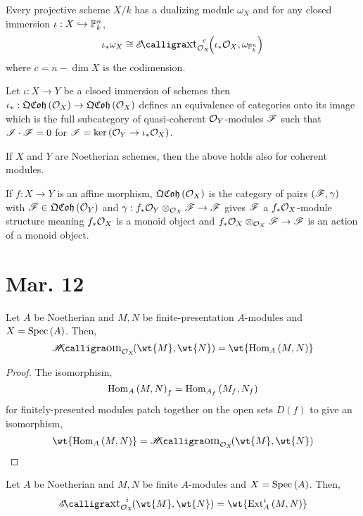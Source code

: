 \documentclass[12pt]{article}
\begin{document}
\begin{theorem}
Every projective scheme $X / k$ has a dualizing module $\omega_X$ and for any closed immersion $\iota : X \hookrightarrow \mathbb{P}^n_k$,
\[ \iota_* \omega_X \cong \shExt{c}{\struct{X}}{\iota_* \struct{X}}{\omega_{\P^n_k}} \]
where $c = n - \dim{X}$ is the codimension. 
\end{theorem}

\begin{lemma}
Let $\iota : X \to Y$ be a clsoed immersion of schemes then $\iota_* : \mathfrak{QCoh}\left(\mathcal{O}_{X}\right) \to \mathfrak{QCoh}\left(\mathcal{O}_{X}\right)$ defines an equivalence of categories onto its image which is the full subcategory of quasi-coherent $\mathcal{O}_{Y}$-modules $\mathscr{F}$ such that $\mathscr{I} \cdot \mathscr{F} = 0$ for $\mathscr{I} = \ker{(\mathcal{O}_{Y} \to \iota_* \mathcal{O}_{X})}$.
\end{lemma}

\begin{rmk}
If $X$ and $Y$ are Noetherian schemes, then the above holds also for coherent modules. 
\end{rmk}

\begin{rmk}
If $f : X \to Y$ is an affine morphism, $\mathfrak{QCoh}\left(\mathcal{O}_{X}\right)$ is the category of pairs $(\mathscr{F}, \gamma)$ with $\mathscr{F} \in \mathfrak{QCoh}\left(\mathcal{O}_{Y}\right)$ and $\gamma : f_* \mathcal{O}_{Y} \otimes_{\mathcal{O}_{X}} \mathscr{F} \to \mathscr{F}$ gives $\mathscr{F}$ a $f_* \mathcal{O}_{X}$-module structure meaning $f_* \mathcal{O}_{X}$ is a monoid object and $f_* \mathcal{O}_{X} \otimes_{\mathcal{O}_{X}} \mathscr{F} \to \mathscr{F}$ is an action of a monoid object.
\end{rmk}

\section{Mar. 12}

\begin{lemma}
Let $A$ be Noetherian and $M, N$ be finite-presentation $A$-modules and $X = \mathrm{Spec}\left( A \right)$. Then,
\[ \shHom{\struct{X}}{\wt{M}}{\wt{N}} = \wt{\Hom{A}{M}{N}} \]
\end{lemma}

\begin{proof}
The isomorphism,
\[ \mathrm{Hom}_{A} \left( M, N \right)_f = \mathrm{Hom}_{A_f} \left( M_f, N_f \right) \]
for finitely-presented modules patch together on the open sets $D(f)$ to give an isomorphism,
\[ \wt{\Hom{A}{M}{N}} = \shHom{\struct{X}}{\wt{M}}{\wt{N}} \]
\end{proof}

\begin{lemma}
Let $A$ be Noetherian and $M, N$ be finite $A$-modules and $X = \mathrm{Spec}\left( A \right)$. Then,
\[ \shExt{i}{\struct{X}}{\wt{M}}{\wt{N}} = \wt{\Ext{i}{A}{M}{N}} \]
\end{lemma}
\end{document}
